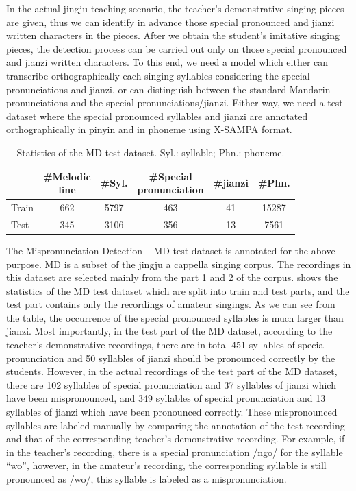In the actual jingju teaching scenario, the teacher's demonstrative singing pieces are given, thus we can identify in advance those special pronounced and jianzi written characters in the pieces. After we obtain the student's imitative singing pieces, the detection process can be carried out only on those special pronounced and jianzi written characters. To this end, we need a model which either can transcribe orthographically each singing syllables considering the special pronunciations and jianzi, or can distinguish between the standard Mandarin pronunciations and the special pronunciations/jianzi. Either way, we need a test dataset where the special pronounced syllables and jianzi are annotated orthographically in pinyin and in phoneme using X-SAMPA format.

\begin{table}[ht]
    \centering
    \begin{tabular}{l|ccccc}
        \toprule
        & \makecell{\#Melodic\\line} & \#Syl. & \makecell{\#Special\\pronunciation} & \#jianzi & \#Phn. \\
        \midrule
        Train           & 662 & 5797 & 463 & 41 & 15287 \\
        Test               & 345 & 3106 & 356 & 13 & 7561 \\
        \bottomrule
    \end{tabular}
    \caption{Statistics of the MD test dataset. Syl.: syllable; Phn.: phoneme.}
    \label{table:ch4:detailInfoDataset_md}
\end{table}

The Mispronunciation Detection -- MD test dataset is annotated for the above purpose. MD is a subset of the jingju a cappella singing corpus. The recordings in this dataset are selected mainly from the part 1 and 2 of the corpus.  shows the statistics of the MD test dataset which are split into train and test parts, and the test part contains only the recordings of amateur singings. As we can see from the table, the occurrence of the special pronounced syllables is much larger than jianzi. Most importantly, in the test part of the MD dataset, according to the teacher's demonstrative recordings, there are in total 451 syllables of special pronunciation and 50 syllables of jianzi should be pronounced correctly by the students. However, in the actual recordings of the test part of the MD dataset, there are 102 syllables of special pronunciation and 37 syllables of jianzi which have been mispronounced, and 349 syllables of special pronunciation and 13 syllables of jianzi which have been pronounced correctly. These mispronounced syllables are labeled manually by comparing the annotation of the test recording and that of the corresponding teacher's demonstrative recording. For example, if in the teacher's recording, there is a special pronunciation /ngo/ for the syllable ``wo”, however, in the amateur's recording, the corresponding syllable is still pronounced as /wo/, this syllable is labeled as a mispronunciation.


